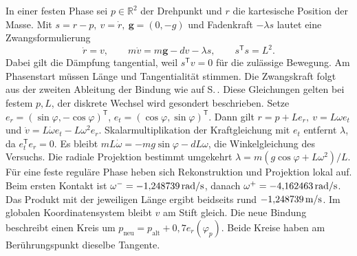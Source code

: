 In einer festen Phase sei \(p\in\mathbb R^2\) der Drehpunkt und \(r\) die kartesische Position der Masse. Mit \(s=r-p,\ v=\dot r,\ \mathbf g=(0,-g)\) und Fadenkraft \(-\lambda s\) lautet eine Zwangsformulierung
\[
 \dot r=v,\qquad m\dot v=m\mathbf g-dv-\lambda s,\qquad s^\mathsf T s=L^2 .
\]
Dabei gilt die Dämpfung tangential, weil \(s^\mathsf Tv=0\) für die zulässige Bewegung. Am Phasenstart müssen Länge und Tangentialität stimmen. Die Zwangskraft folgt aus der zweiten Ableitung der Bindung wie auf S.\,. Diese Gleichungen gelten bei festem \(p,L\), der diskrete Wechsel wird gesondert beschrieben.
Setze \(e_r=(\sin\varphi,-\cos\varphi)^\mathsf T\), \(e_t=(\cos\varphi,\sin\varphi)^\mathsf T\). Dann gilt \(r=p+Le_r,\ v=L\omega e_t\) und \(\dot v=L\dot\omega e_t-L\omega^2e_r\). Skalarmultiplikation der Kraftgleichung mit \(e_t\) entfernt \(\lambda\), da \(e_t^\mathsf T e_r=0\). Es bleibt \(mL\dot\omega=-mg\sin\varphi-dL\omega\), die Winkelgleichung des Versuchs. Die radiale Projektion bestimmt umgekehrt \(\lambda=m(g\cos\varphi+L\omega^2)/L\). Für eine feste reguläre Phase heben sich Rekonstruktion und Projektion lokal auf.
Beim ersten Kontakt ist \(\omega^-=-1{,}248739\,\mathrm{rad/s}\), danach \(\omega^+=-4{,}162463\,\mathrm{rad/s}\). Das Produkt mit der jeweiligen Länge ergibt beidseits rund \(-1{,}248739\,\mathrm{m/s}\). Im globalen Koordinatensystem bleibt \(v\) am Stift gleich. Die neue Bindung beschreibt einen Kreis um \(p_\mathrm{neu}=p_\mathrm{alt}+0{,}7e_r(\varphi_p)\). Beide Kreise haben am Berührungspunkt dieselbe Tangente.

